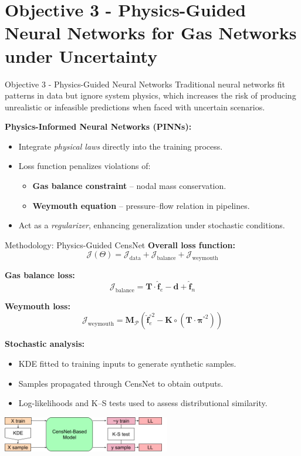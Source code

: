 \documentclass[hyperref={colorlinks,citecolor=blue,linkcolor=blue,urlcolor=blue}]{beamer}
\begin{document}
\section{Objective 3 - Physics-Guided Neural Networks for Gas Networks under Uncertainty}
\begin{frame}{Objective 3 - Physics-Guided Neural Networks}
\small
\justifying
Traditional neural networks fit patterns in data but ignore system physics, 
which increases the risk of producing unrealistic or infeasible predictions 
when faced with uncertain scenarios.

\medskip
\textbf{Physics-Informed Neural Networks (PINNs):}
\begin{itemize}
    \item Integrate \emph{physical laws} directly into the training process.
    \item Loss function penalizes violations of:
    \begin{itemize}
        \item \textbf{Gas balance constraint} – nodal mass conservation.
        \item \textbf{Weymouth equation} – pressure–flow relation in pipelines.
    \end{itemize}
    \item Act as a \emph{regularizer}, enhancing generalization under stochastic conditions.
\end{itemize}
\end{frame}


\begin{frame}{Methodology: Physics-Guided CensNet}
\scriptsize
\textbf{Overall loss function:}
\[
\mathcal{J}(\Theta) =
\mathcal{J}_{\text{data}} +
\mathcal{J}_{\text{balance}} +
\mathcal{J}_{\text{weymouth}}
\]

\textbf{Gas balance loss:}
\[
\mathcal{J}_{\text{balance}} =
\mathbf{T} \cdot \hat{\mathbf{f}}_e - \mathbf{d} + \hat{\mathbf{f}}_n
\]


\textbf{Weymouth loss:}
\[
\mathcal{J}_{\text{weymouth}} =
\mathbf{M}_{\mathcal{P}}
\left( \hat{\mathbf{f}}_e^{\circ 2} -
\mathbf{K} \circ \left(\mathbf{T} \cdot \hat{\boldsymbol{\pi}}^{\circ 2} \right) \right)
\]

\vspace{0.5em}
\textbf{Stochastic analysis:}
\begin{itemize}
    \item KDE fitted to training inputs to generate synthetic samples.
    \item Samples propagated through CensNet to obtain outputs.
    \item Log-likelihoods and K–S tests used to assess distributional similarity.
\end{itemize}

\begin{center}
    \includegraphics[width=0.55\textwidth]{figures/Censnet_model.png}
\end{center}

\end{frame}
\end{document}
